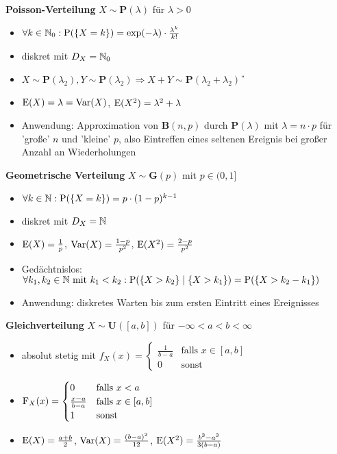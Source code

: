 \textbf{Poisson-Verteilung} $X\sim\mathbf{P}(\lambda)$ für $\lambda>0$
\begin{itemize}
\item $\forall k\in\mathbb{N}_0:\operatorname{P}(\{X=k\})=\exp(-\lambda)\cdot\frac{\lambda^k}{k!}$

\item diskret mit $D_X=\mathbb{N}_0$

\item $X\sim\mathbf{P}(\lambda_2), Y\sim\mathbf{P}(\lambda_2)
\Rightarrow X+Y\sim\mathbf{P}(\lambda_2 + \lambda_2)$ \U

\item $\operatorname{E}(X)=\lambda=\operatorname{Var}(X)$, $\operatorname{E}(X^2)=\lambda^2+\lambda$

\item Anwendung: Approximation von $\mathbf{B}(n,p)$ durch $\mathbf{P}(\lambda)$
mit $\lambda=n\cdot p$ für 'große' $n$ und 'kleine' $p$, also Eintreffen eines
seltenen Ereignis bei großer Anzahl an Wiederholungen
\end{itemize}

\newpage
\textbf{Geometrische Verteilung} $X\sim\mathbf{G}(p)$ mit $p\in\textbf{(}0,1]$
\begin{itemize}
\item $\forall k\in\mathbb{N}:\operatorname{P}(\{X=k\})=p\cdot(1-p)^{k-1}$

\item diskret mit $D_X=\mathbb{N}$

\item $\operatorname{E}(X)=\frac{1}{p}$, $\operatorname{Var}(X)=\frac{1-p}{p^2}$, $\operatorname{E}(X^2)=\frac{2-p}{p^2}$

\item Gedächtnislos:\\ $\forall k_1,k_2\in\mathbb{N} \text{ mit } k_1<k_2:
\operatorname{P}(\{X>k_2\}\mid \{ X>k_1\}) = \operatorname{P}(\{X>k_2-k_1\})$

\item Anwendung: diskretes Warten bis zum ersten Eintritt eines Ereignisses
\end{itemize}

\textbf{Gleichverteilung} $X\sim\mathbf{U}([a,b])$ für $-\infty<a<b<\infty$
\begin{itemize}
\item absolut stetig mit 
$f_X(x)=\begin{cases}
\frac{1}{b-a} 	& \text{falls } x\in [a,b]	\\
0				& \text{sonst }		
\end{cases}$

\item
$\operatorname{F}_X(x)=\begin{cases}
0 				& \text{falls } x<a			\\
\frac{x-a}{b-a}	& \text{falls } x\in [a,b]	\\
1				& \text{sonst}
\end{cases}$

\item $\operatorname{E}(X)=\frac{a+b}{2}$, $\operatorname{Var}(X)=\frac{(b-a)^2}{12}$,
$\operatorname{E}(X^2)=\frac{b^3-a^3}{3(b-a)}$
\end{itemize}

